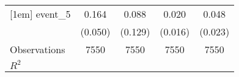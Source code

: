 {\begin{tabular}{l*{4}{c}}
[1em]
event\_5             &       0.164\sym{***}&       0.088         &       0.020         &       0.048\sym{**} \\
                    &     (0.050)         &     (0.129)         &     (0.016)         &     (0.023)         \\
\hline
Observations        &        7550         &        7550         &        7550         &        7550         \\
\(R^{2}\)           &                     &                     &                     &                     \\
\hline\hline
\end{tabular}
}
